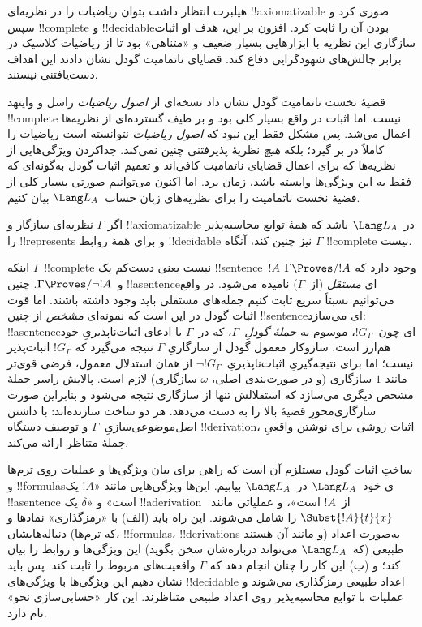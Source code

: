 \documentclass[../../../include/open-logic-section]{subfiles}
\begin{document}


هیلبرت انتظار داشت بتوان ریاضیات را در نظریه‌ای !!{axiomatizable}
صوری کرد و سپس !!{complete} و !!{decidable}بودن آن را ثابت کرد. افزون
بر این، هدف او اثبات سازگاری این نظریه با ابزارهایی بسیار ضعیف و
«متناهی» بود تا از ریاضیات کلاسیک در برابر چالش‌های شهودگرایی دفاع
کند. قضایای ناتمامیت گودل نشان دادند این اهداف دست‌یافتنی نیستند.

قضیهٔ نخست ناتمامیت گودل نشان داد نسخه‌ای از \emph{اصول ریاضیات}
راسل و وایتهد !!{complete} نیست. اما اثبات در واقع بسیار کلی بود و بر
طیف گسترده‌ای از نظریه‌ها اعمال می‌شد. پس مشکل فقط این نبود که
\emph{اصول ریاضیات} نتوانسته است ریاضیات را کاملاً در بر گیرد؛ بلکه
\emph{هیچ} نظریهٔ پذیرفتنی چنین نمی‌کند. جداکردن ویژگی‌هایی از
نظریه‌ها که برای اعمال قضایای ناتمامیت کافی‌اند و تعمیم اثبات گودل
به‌گونه‌ای که فقط به این ویژگی‌ها وابسته باشد، زمان برد. اما اکنون
می‌توانیم صورتی بسیار کلی از قضیهٔ نخست ناتمامیت را برای نظریه‌های
زبان حساب~$\Lang L_A$ بیان کنیم.

\begin{thm}
اگر $\Gamma$ نظریه‌ای سازگار و !!{axiomatizable} در~$\Lang L_A$
باشد که همهٔ توابع محاسبه‌پذیر را !!{represents} و برای همهٔ روابط
!!{decidable} نیز چنین کند، آنگاه $\Gamma$ !!{complete} نیست.
\end{thm}

اینکه $\Gamma$ !!{complete} نیست یعنی دست‌کم یک !!{sentence}ٔ~$!A$ وجود دارد
که $\Gamma\Proves/ !A$ و~$\Gamma\Proves/\lnot !A$. چنین !!a{sentence}ای
\emph{مستقل} (از~$\Gamma$) نامیده می‌شود. در واقع می‌توانیم نسبتاً
سریع ثابت کنیم جمله‌های مستقلی باید وجود داشته باشند. اما قوت اثبات
گودل در این است که نمونه‌ای \emph{مشخص} از چنین !!{sentence}ای می‌سازد:
!!a{sentence}ای چون~$!G_\Gamma$، موسوم به \emph{جملهٔ گودلِ}~$\Gamma$، که در~$\Gamma$ با
ادعای اثبات‌ناپذیریِ خود هم‌ارز است. سازوکار معمول گودل از سازگاریِ
$\Gamma$ نتیجه می‌گیرد که $!G_\Gamma$ اثبات‌پذیر نیست؛ اما برای
نتیجه‌گیریِ اثبات‌ناپذیریِ~$\lnot !G_\Gamma$ از همان استدلال معمول،
فرضی قوی‌تر مانند $1$-سازگاری (و در صورت‌بندی اصلی،
$\omega$-سازگاری) لازم است. پالایش راسر جملهٔ مشخص دیگری می‌سازد که
استقلالش تنها از سازگاری نتیجه می‌شود و بنابراین صورت سازگاری‌محورِ
قضیهٔ بالا را به دست می‌دهد. هر دو ساخت سازنده‌اند: با داشتن
اصل‌موضوعی‌سازیِ~$\Gamma$ و توصیف دستگاه !!{derivation}، اثبات روشی برای
نوشتن واقعیِ جملهٔ متناظر ارائه می‌کند.

ساختِ اثبات گودل مستلزم آن است که راهی برای بیان ویژگی‌ها و عملیات
روی ترم‌ها و !!{formula}sی خود~$\Lang L_A$ در~$\Lang L_A$ بیابیم.
این‌ها ویژگی‌هایی مانند «$!A$ یک !!a{sentence} است» و «$\delta$ یک
!!a{derivation} از~$!A$ است»، و عملیاتی مانند~$\Subst{!A}{t}{x}$ را شامل
می‌شوند. این راه باید (الف) با «رمزگذاری» نمادها و دنباله‌هایشان (که
ترم‌ها، !!{formula}s، !!{derivation}s و مانند آن هستند) به‌صورت اعداد
طبیعی (که~$\Lang L_A$ می‌تواند درباره‌شان سخن بگوید) این ویژگی‌ها و
روابط را بیان کند؛ و (ب) این کار را چنان انجام دهد که $\Gamma$
واقعیت‌های مربوط را ثابت کند. پس باید نشان دهیم این ویژگی‌ها با
ویژگی‌های !!{decidable} اعداد طبیعی رمزگذاری می‌شوند و عملیات با
توابع محاسبه‌پذیر روی اعداد طبیعی متناظرند. این کار «حسابی‌سازی نحو»
نام دارد.
\end{document}
